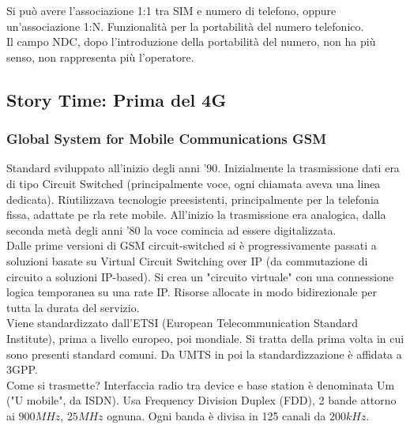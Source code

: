 Si può avere l'associazione 1:1 tra SIM e numero di telefono, oppure un'associazione 1:N. Funzionalità per la portabilità del numero telefonico. \\

Il campo NDC, dopo l'introduzione della portabilità del numero, non ha più senso, non rappresenta più l'operatore.\\


\newpage

\subsection{Story Time: Prima del 4G}

\subsubsection{Global System for Mobile Communications GSM}

Standard sviluppato all'inizio degli anni '90. Inizialmente la trasmissione dati era di tipo Circuit Switched (principalmente voce, ogni chiamata aveva una linea dedicata).  Riutilizzava tecnologie preesistenti, principalmente per la telefonia fissa, adattate pe rla rete mobile. All'inizio la trasmissione era analogica, dalla seconda metà degli anni '80 la voce comincia ad essere digitalizzata.\\

Dalle prime versioni di GSM circuit-switched si è progressivamente passati a soluzioni basate su Virtual Circuit Switching over IP (da commutazione di circuito a soluzioni IP-based). Si crea un "circuito virtuale" con una connessione logica temporanea su una rate IP. Risorse allocate in modo bidirezionale per tutta la durata del servizio.\\


Viene standardizzato dall'ETSI (European Telecommunication Standard Institute), prima a livello europeo, poi mondiale. Si tratta della prima volta in cui sono presenti standard comuni. Da UMTS in poi la standardizzazione è affidata a 3GPP.\\

Come si trasmette? Interfaccia radio tra device e base station è denominata Um ("U mobile", da ISDN). Usa Frequency Division Duplex (FDD), 2 bande attorno ai $900MHz$, $25MHz$ ognuna. Ogni banda è divisa in 125 canali da $200kHz$. \\

